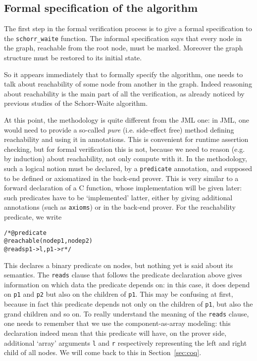 \subsection{Formal specification of the algorithm}
\label{sec:spec}

The first step in the formal verification process is to give a formal
specification to the \verb|schorr_waite| function. The informal
specification says that every node in the graph, reachable from the
root node, must be marked. Moreover the graph structure must be
restored to its initial state.

So it appears immediately that to formally specify the algorithm, one
needs to talk about reachability of some node from another in the
graph. Indeed reasoning about reachability is the main part of all the
verification, as already noticed by previous studies of the
Schorr-Waite algorithm.

At this point, the \caduceus{} methodology is quite different from the
JML one: in JML, one would need to provide a so-called \emph{pure}
(i.e. side-effect free) method defining reachability and using it in
annotations. This is convenient for runtime assertion checking, but
for formal verification this is not, because we need to reason (e.g.
by induction) about reachability, not only compute with it. In the
\caduceus{} methodology, such a logical notion must be declared, by a
\verb|predicate| annotation, and supposed to be defined or axiomatized
in the back-end prover. This is very similar to a forward declaration
of a C function, whose implementation will be given later: such
predicates have to be `implemented' latter, either by giving
additional \caduceus{} annotations (such as \verb|axioms|) or in the
back-end prover. For the reachability predicate, we write
\pagebreak
\begin{alltt}\begin{slshape}
/*@ predicate 
  @   reachable(node p1, node p2) 
  @   reads p1->l,p1->r */
\end{slshape}\end{alltt}
This declares a binary predicate on nodes, but nothing yet is
said about its semantics. The \texttt{reads} clause that follows the predicate
declaration above gives information on which data the predicate
depends on: in this case, it does depend on \verb|p1| and
\verb|p2| but also on the children of \verb|p1|. This may be confusing
at first, because in fact this predicate depends not only on the
children of \verb|p1|, but also the grand children and so on. To
really understand the meaning of the \texttt{reads} clause, one needs
to remember that we use the component-as-array modeling: this
declaration indeed mean that this predicate will have, on the prover
side, additional `array' arguments \verb|l| and \verb|r| respectively
representing the left and right child of all nodes. We will come back
to this in Section~\ref{sec:coq}.


